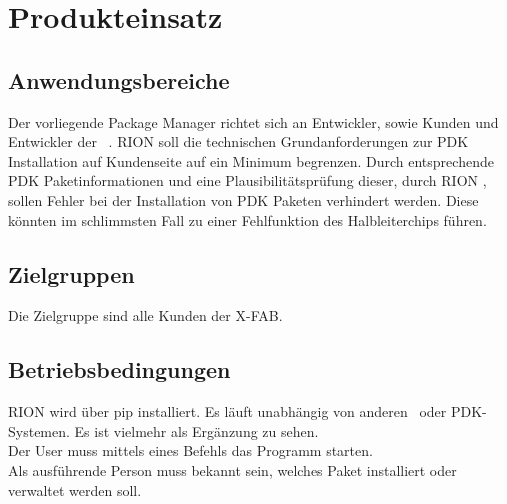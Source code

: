 \chapter{Produkteinsatz}

\section{Anwendungsbereiche}
Der vorliegende Package Manager richtet sich an Entwickler, sowie Kunden und Entwickler der \x~.
RION soll die technischen Grundanforderungen zur PDK Installation auf Kundenseite auf ein Minimum begrenzen. Durch entsprechende PDK Paketinformationen und eine Plausibilitätsprüfung dieser, durch RION , sollen Fehler bei der Installation von PDK Paketen verhindert werden. Diese könnten im schlimmsten Fall zu einer Fehlfunktion des Halbleiterchips führen.
\section{Zielgruppen}
Die Zielgruppe sind alle Kunden der X-FAB.


\section{Betriebsbedingungen}
RION wird über pip installiert. Es läuft unabhängig von anderen \x~oder PDK-Systemen. Es ist vielmehr als Ergänzung zu sehen.\\
Der User muss mittels eines Befehls das Programm starten.\\
Als ausführende Person muss bekannt sein, welches Paket installiert oder verwaltet werden soll.
